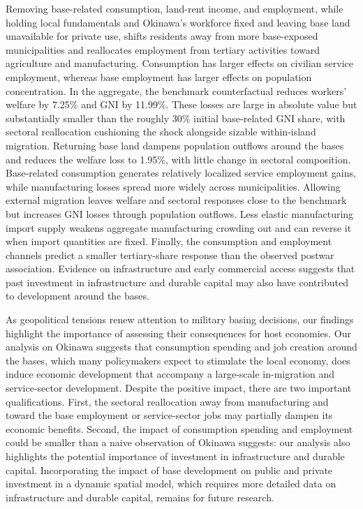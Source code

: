 \documentclass[12pt, unicode, a4paper]{article}
\newcommand{\1}{\mbox{1}\hspace{-0.25em}\mbox{l}} %
\begin{document}
Removing base-related consumption, land-rent income, and employment, while holding local fundamentals and Okinawa's workforce fixed and leaving base land unavailable for private use, shifts residents away from more base-exposed municipalities and reallocates employment from tertiary activities toward agriculture and manufacturing. Consumption has larger effects on civilian service employment, whereas base employment has larger effects on population concentration.
In the aggregate, the benchmark counterfactual reduces workers' welfare by 7.25\% and GNI by 11.99\%. These losses are large in absolute value but substantially smaller than the roughly 30\% initial base-related GNI share, with sectoral reallocation cushioning the shock alongside sizable within-island migration. Returning base land dampens population outflows around the bases and reduces the welfare loss to 1.95\%, with little change in sectoral composition. Base-related consumption generates relatively localized service employment gains, while manufacturing losses spread more widely across municipalities. Allowing external migration leaves welfare and sectoral responses close to the benchmark but increases GNI losses through population outflows. Less elastic manufacturing import supply weakens aggregate manufacturing crowding out and can reverse it when import quantities are fixed.
Finally, the consumption and employment channels predict a smaller tertiary-share response than the observed postwar association. Evidence on infrastructure and early commercial access suggests that past investment in infrastructure and durable capital may also have contributed to development around the bases.

As geopolitical tensions renew attention to military basing decisions, our findings highlight the importance of assessing their consequences for host economies. 
Our analysis on Okinawa suggests that consumption spending and job creation around the bases, which many policymakers expect to stimulate the local economy, does induce economic development that accompany a large-scale in-migration and service-sector development. Despite the positive impact, there are two important qualifications. First, the sectoral reallocation away from manufacturing and toward the base employment or service-sector jobs may partially dampen its economic benefits. Second, the impact of consumption spending and employment could be smaller than a naive observation of Okinawa suggests: our analysis also highlights the potential importance of investment in infrastructure and durable capital. Incorporating the impact of base development on public and private investment in a dynamic spatial model, which requires more detailed data on infrastructure and durable capital, remains for future research.
\end{document}
